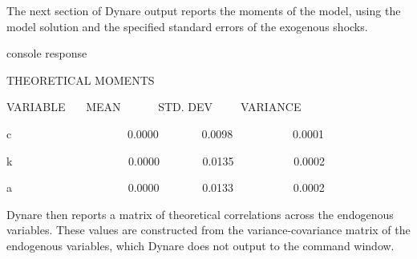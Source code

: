\documentclass[a4paper,12pt]{article}%
\begin{document}
The next section of Dynare output reports the moments of the model, using the
model solution and the specified standard errors of the exogenous shocks.%

\vspace{3ex}
\begin{myresult}{console response}%


\textsf{THEORETICAL MOMENTS}

\textsf{%
\vspace{3ex}%
}

\textsf{VARIABLE \ \ \ MEAN \ \ \ \ \ \ STD. DEV\ \ \ \ \ VARIANCE}

\textsf{c \ \ \ \ \ \ \ \ \ \ \ \ \ \ \ \ \ \ \ \ 0.0000 \ \ \ \ \ \ \ 0.0098
\ \ \ \ \ \ \ \ \ \ 0.0001}

\textsf{k \ \ \ \ \ \ \ \ \ \ \ \ \ \ \ \ \ \ \ \ 0.0000 \ \ \ \ \ \ \ 0.0135
\ \ \ \ \ \ \ \ \ \ 0.0002}

\textsf{a \ \ \ \ \ \ \ \ \ \ \ \ \ \ \ \ \ \ \ \ 0.0000 \ \ \ \ \ \ \ 0.0133
\ \ \ \ \ \ \ \ \ \ 0.0002}%

\end{myresult}
\vspace{3ex}%


Dynare then reports a matrix of theoretical correlations across the endogenous
variables. These values are constructed from the variance-covariance matrix of
the endogenous variables, which Dynare does not output to the command window.%
\end{document}
